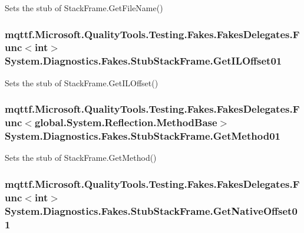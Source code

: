 Sets the stub of Stack\-Frame.\-Get\-File\-Name()

\hypertarget{class_system_1_1_diagnostics_1_1_fakes_1_1_stub_stack_frame_a6d6340cc7092fad0e78c3c9693c313ef}{
\subsubsection[{Get\-I\-L\-Offset01}]{\setlength{\rightskip}{0pt plus 5cm}mqttf.\-Microsoft.\-Quality\-Tools.\-Testing.\-Fakes.\-Fakes\-Delegates.\-Func$<$int$>$ System.\-Diagnostics.\-Fakes.\-Stub\-Stack\-Frame.\-Get\-I\-L\-Offset01}}\label{class_system_1_1_diagnostics_1_1_fakes_1_1_stub_stack_frame_a6d6340cc7092fad0e78c3c9693c313ef}


Sets the stub of Stack\-Frame.\-Get\-I\-L\-Offset()

\hypertarget{class_system_1_1_diagnostics_1_1_fakes_1_1_stub_stack_frame_a33646ada16935c8df3ceccd08ccc02ae}{
\subsubsection[{Get\-Method01}]{\setlength{\rightskip}{0pt plus 5cm}mqttf.\-Microsoft.\-Quality\-Tools.\-Testing.\-Fakes.\-Fakes\-Delegates.\-Func$<$global.\-System.\-Reflection.\-Method\-Base$>$ System.\-Diagnostics.\-Fakes.\-Stub\-Stack\-Frame.\-Get\-Method01}}\label{class_system_1_1_diagnostics_1_1_fakes_1_1_stub_stack_frame_a33646ada16935c8df3ceccd08ccc02ae}


Sets the stub of Stack\-Frame.\-Get\-Method()

\hypertarget{class_system_1_1_diagnostics_1_1_fakes_1_1_stub_stack_frame_a20a93177020a6feff97403d69508a505}{
\subsubsection[{Get\-Native\-Offset01}]{\setlength{\rightskip}{0pt plus 5cm}mqttf.\-Microsoft.\-Quality\-Tools.\-Testing.\-Fakes.\-Fakes\-Delegates.\-Func$<$int$>$ System.\-Diagnostics.\-Fakes.\-Stub\-Stack\-Frame.\-Get\-Native\-Offset01}}\label{class_system_1_1_diagnostics_1_1_fakes_1_1_stub_stack_frame_a20a93177020a6feff97403d69508a505}


